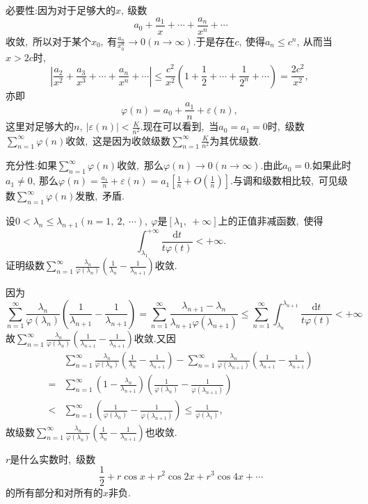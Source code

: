 	\begin{solution}
		必要性:因为对于足够大的$x,\ $级数
		$$a_0+\frac{a_1}{x}+\cdots+\frac{a_n}{x^n}+\cdots$$
		收敛,\ 所以对于某个$x_0,\ $有$\frac{a_n}{x_0^n}\rightarrow0(n\rightarrow\infty).$于是存在$c,\ $使得$a_n\le c^n,\ $从而当$x>2c$时,\ 
		$$\left|\frac{a_2}{x^2}+\frac{a_3}{x^3}+\cdots+\frac{a_n}{x^n}+\cdots\right|\le\frac{c^2}{x^2}\left(1+\frac{1}{2}+\cdots+\frac{1}{2^n}+\cdots\right)=\frac{2c^2}{x^2},\ $$
		亦即
		$$\varphi(n)=a_0+\frac{a_1}{n}+\varepsilon(n),\ $$
		这里对足够大的$n,\ |\varepsilon(n)|<\frac{K}{n^2}.$现在可以看到,\ 当$a_0=a_1=0$时,\ 级数$\sum\limits_{n=1}^{\infty}\varphi(n)$收敛,\ 这是因为收敛级数$\sum\limits_{n=1}^{\infty}\frac{K}{n^2}$为其优级数.
		
		充分性:如果$\sum\limits_{n=1}^{\infty}\varphi(n)$收敛,\ 那么$\varphi(n)\rightarrow0(n\rightarrow\infty).$由此$a_0=0.$如果此时$a_1\neq 0,\ $那么$\varphi(n)=\frac{a_1}{n}+\varepsilon(n)=a_1\left[\frac{1}{n}+O\left(\frac{1}{n}\right)\right].$与调和级数相比较,\ 可见级数$\sum\limits_{n=1}^{\infty}\varphi(n)$发散,\ 矛盾. 
	\end{solution}
	\newpage
	\begin{problem}
		设$0<\lambda_n\le\lambda_{n+1}(n=1,\ 2,\ \cdots),\ \varphi$是$\left[\lambda_1,\ +\infty\right]$上的正值非减函数,\ 使得
		$$\int_{\lambda_1}^{+\infty}\frac{\text{d}t}{t\varphi(t)}<+\infty.$$
		证明级数$\sum\limits_{n=1}^{\infty}\frac{\lambda_n}{\varphi(\lambda_n)}\left(\frac{1}{\lambda_n}-\frac{1}{\lambda_{n+1}}\right)$收敛.
	\end{problem}
	
	\begin{solution}
		因为
		$$\sum\limits_{n=1}^{\infty}\frac{\lambda_n}{\varphi(\lambda_n)}\left(\frac{1}{\lambda_{n+1}}-\frac{1}{\lambda_{n+1}}\right)=\sum\limits_{n=1}^{\infty}\frac{\lambda_{n+1}-\lambda_n}{\lambda_{n+1}\varphi(\lambda_{n+1})}\le\sum\limits_{n=1}^{\infty}\int_{\lambda_n}^{\lambda_{n+1}}\frac{\text{d}t}{t\varphi(t)}<+\infty$$
		故$\sum\limits_{n=1}^{\infty}\frac{\lambda_n}{\varphi(\lambda_n)}\left(\frac{1}{\lambda_{n+1}}-\frac{1}{\lambda_{n+1}}\right)$收敛.又因
		\begin{align*}
			&\sum\limits_{n=1}^{\infty}\frac{\lambda_n}{\varphi(\lambda_n)}\left(\frac{1}{\lambda_n}-\frac{1}{\lambda_{n+1}}\right)-\sum\limits_{n=1}^{\infty}\frac{\lambda_n}{\varphi(\lambda_{n+1})}\left(\frac{1}{\lambda_{n+1}}-\frac{1}{\lambda_{n+1}}\right)\\
			=&\sum\limits_{n=1}^{\infty}\left(1-\frac{\lambda_n}{\lambda_{n+1}}\right)\left(\frac{1}{\varphi(\lambda_n)}-\frac{1}{\varphi(\lambda_{n+1})}\right)\\
			<&\sum\limits_{n=1}^{\infty}\left(\frac{1}{\varphi(\lambda_n)}-\frac{1}{\varphi(\lambda_{n+1})}\right)\le\frac{1}{\varphi(\lambda_1)},\ 
		\end{align*}
		故级数$\sum\limits_{n=1}^{\infty}\frac{\lambda_n}{\varphi(\lambda_n)}\left(\frac{1}{\lambda_n}-\frac{1}{\lambda_{n+1}}\right)$也收敛. 
	\end{solution}
	\newpage
	\begin{problem}
		$r$是什么实数时,\ 级数
		$$\frac{1}{2}+r\cos x+r^2\cos 2x+r^3\cos 4x+\cdots$$
		的所有部分和对所有的$x$非负.
	\end{problem}
	
